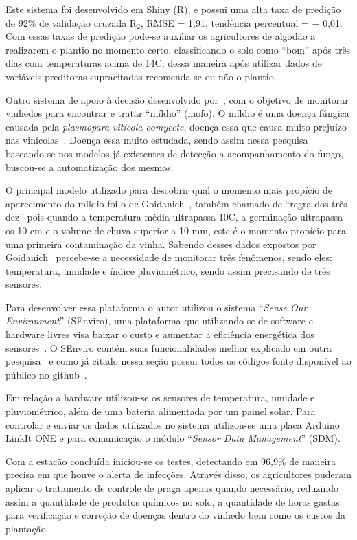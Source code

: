 \documentclass[
article,			%
12pt,				%
oneside,			%
a4paper,			%
english,			%
brazil,				%
sumario=tradicional
]{abntex2}
\begin{document}
Este sistema foi desenvolvido em Shiny (R), e possui uma alta taxa de predição de 92\% de validação cruzada R$_{2}$, RMSE = 1,91, tendência percentual = $-$ 0,01.
Com essas taxas de predição pode-se auxiliar os agricultores de algodão a realizarem o plantio no momento certo, classificando o solo como ``bom'' após três dias com temperaturas acima de 14\textdegree C, dessa maneira após utilizar dados de variáveis preditoras supracitadas recomenda-se ou não o plantio.

Outro sistema de apoio à decisão desenvolvido por~\citeauthor{2}, com o objetivo de monitorar vinhedos para encontrar e tratar ``míldio'' (mofo).
O míldio é uma doença fúngica causada pela \textit{plasmopara viticola oomycete}, doença essa que causa muito prejuízo nas vinícolas~\cite{2}. Doença essa muito estudada, sendo assim nessa pesquisa baseando-se nos modelos já existentes de detecção a acompanhamento do fungo, buscou-se a automatização dos mesmos.

O principal modelo utilizado para descobrir qual o momento mais propício de aparecimento do míldio foi o de Goidanich~\cite{detectando_milidio}, também chamado de ``regra dos três dez'' pois quando a temperatura média ultrapassa 10\textdegree C, a germinação ultrapassa os 10 cm e o volume de chuva superior a 10 mm, este é o momento propício para uma primeira contaminação da vinha.
Sabendo desses dados expostos por Goidanich~\cite{detectando_milidio} percebe-se a necessidade de monitorar três fenômenos, sendo eles: temperatura, umidade e índice pluviométrico, sendo assim precisando de três sensores.

Para desenvolver essa plataforma o autor utilizou o sistema ``\textit{Sense Our Environment}'' (SEnviro), uma plataforma que utilizando-se de software e hardware livres visa baixar o custo e aumentar a eficiência energética dos sensores~\cite{2}. O SEnviro contém suas funcionalidades melhor explicado em outra pesquisa~\cite{SEnviro} e como já citado nessa seção possui todos os códigos fonte disponível ao público no github~\cite{SEnviro_Github}.

Em relação a hardware utilizou-se os sensores de temperatura, umidade e pluviométrico, além de uma bateria alimentada por um painel solar. Para controlar e enviar os dados utilizados no sistema utilizou-se uma placa Arduino LinkIt ONE e para comunicação o módulo ``\textit{Sensor Data Management}'' (SDM).

Com a estacão concluída iniciou-se os testes, detectando em 96,9\% de maneira precisa em que houve o alerta de infecções. Através disso, os agricultores puderam aplicar o tratamento de controle de praga apenas quando necessário, reduzindo assim a quantidade de produtos químicos no solo, a quantidade de horas gastas para verificação e correção de doenças dentro do vinhedo bem como os custos da plantação.
\end{document}
